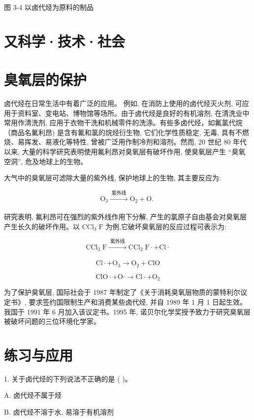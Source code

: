 \documentclass[10pt]{article}
\begin{document}
图 3-4 以卤代烃为原料的制品

\section*{又科学·技术·社会}

\section*{臭氧层的保护}

卤代烃在日常生活中有着广泛的应用。 例如, 在消防上使用的卤代烃灭火剂, 可应用于资料室、变电站、博物馆等场所。由于卤代烃是良好的有机溶剂, 在清洗业中常用作清洗剂, 应用于衣物干洗和机械零件的洗涤。有些多卤代烃，如氟氯代烷（商品名氟利昂) 是含有氟和氯的烷烃衍生物, 它们化学性质稳定, 无毒, 具有不燃烧、易挥发、易液化等特性, 曾被广泛用作制冷剂和溶剂。然而, 20 世纪 80 年代以来, 大量的科学研究表明使用氟利昂对臭氧层有破坏作用, 使臭氧层产生 “臭氧空洞”, 危及地球上的生物。

大气中的臭氧层可滤除大量的紫外线, 保护地球上的生物, 其主要反应为:

\[
{\mathrm{O}}_{3}\xrightarrow[]{\text{ 紫外线 }}{\mathrm{O}}_{2} + \mathrm{O}\text{. }
\]

研究表明, 氟利昂可在强烈的紫外线作用下分解, 产生的氯原子自由基会对臭氧层产生长久的破坏作用。以 \({\mathrm{{CCl}}}_{3}\mathrm{\;F}\) 为例,它破坏臭氧层的反应过程可表示为:

\[
{\mathrm{{CCl}}}_{3}\mathrm{\;F}\xrightarrow[]{\text{ 紫外线 }}{\mathrm{{CCl}}}_{2}\mathrm{\;F} \cdot + \mathrm{{Cl}} \cdot
\]

\[
\mathrm{{Cl}} \cdot + {\mathrm{O}}_{3} \rightarrow {\mathrm{O}}_{2} + \mathrm{{ClO}}
\]

\[
\mathrm{{ClO}} \cdot + \mathrm{O} \cdot \rightarrow \mathrm{{Cl}} \cdot + {\mathrm{O}}_{2}
\]

为了保护臭氧层, 国际社会于 1987 年制定了《关于消耗臭氧层物质的蒙特利尔议定书》, 要求签约国限制生产和消费某些卤代烃, 并自 1989 年 1 月 1 日起生效。我国于 1991 年 6 月加入该议定书。1995 年, 诺贝尔化学奖授予致力于研究臭氧层被破坏问题的三位环境化学家。

\section*{练习与应用}

1. 关于卤代烃的下列说法不正确的是 ( )。

A. 卤代烃不属于烃

B. 卤代烃不溶于水, 易溶于有机溶剂
\end{document}
